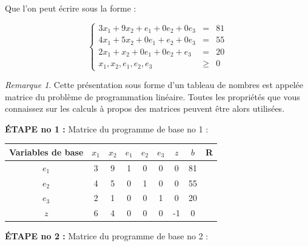 \documentclass[a4paper,12pt,openany]{book}
\theoremstyle{plain}
\theoremstyle{definition}
\theoremstyle{remark}
\newtheorem{remarque}[theorem]{Remarque}
\theoremstyle{nbstyle}
\begin{document}
	Que l'on peut écrire sous la forme :
	
	\[
	\left\{
	\begin{array}{rcl}
	3x_1 + 9x_2 + e_1 + 0e_2 + 0e_3 & = & 81 \\
	4x_1 + 5x_2 + 0e_1 + e_2 + 0e_3 & = & 55 \\
	2x_1 + x_2 + 0e_1 + 0e_2 + e_3 & = & 20 \\
	x_1, x_2, e_1, e_2, e_3 & \geq & 0
	\end{array}
	\right.
	\]
	
	\begin{remarque}
		Cette présentation sous forme d'un tableau de nombres est appelée matrice du problème de programmation linéaire. Toutes les propriétés que vous connaissez sur les calculs à propos des matrices peuvent être alors utilisées.
	\end{remarque}
	
	
	\textbf{ÉTAPE no 1 :} Matrice du programme de base no 1 :
	
	\begin{center}
		\begin{tabular}{c|cccccc|c|c}
			\toprule
			Variables de base & $x_{1}$ & $x_{2}$ & $e_{1}$ & $e_{2}$ & $e_{3}$ & $z$ & $b$&R \\
			\midrule
			$e_{1}$ & 3 & 9 & 1 & 0 & 0 & 0 & 81& \\
			$e_{2}$ & 4 & 5 & 0 & 1 & 0 & 0 & 55 &\\
			$e_{3}$ & 2 & 1 & 0 & 0 & 1 & 0 & 20 &\\
			\hline
			$z$ & 6 & 4 & 0 & 0 & 0 & -1 & 0 &\\
			\bottomrule
		\end{tabular}
	\end{center}
	
	\textbf{ÉTAPE no 2 :} Matrice du programme de base no 2 :
	
\end{document}
